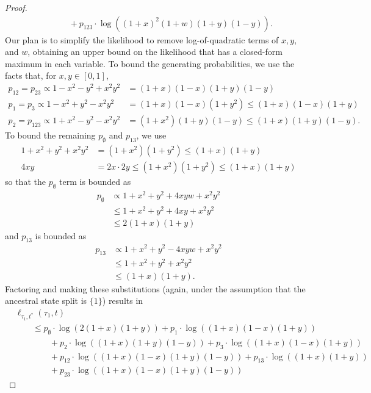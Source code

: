 \begin{proof}
\begin{align}
    &\qquad + p_{123}        \cdot\log((1+x)^2   (1+w)(1+y)(1-y)).
\end{align}
Our plan is to simplify the likelihood to remove log-of-quadratic terms of $x,y,$ and $w$, obtaining an upper bound on the likelihood that has a closed-form maximum in each variable.
To bound the generating probabilities, we use the facts that, for $x,y\in[0,1]$,
\begin{align*}
p_{12} = p_{23} \propto 1-x^2-y^2+x^2y^2 & = (1+x)(1-x)(1+y)(1-y) \\
p_{1} = p_{3} \propto 1-x^2+y^2-x^2y^2 & = (1+x)(1-x)(1+y^2) \le (1+x)(1-x)(1+y) \\
p_{2} = p_{123} \propto 1+x^2-y^2-x^2y^2 & = (1+x^2)(1+y)(1-y) \le (1+x)(1+y)(1-y).
\end{align*}
To bound the remaining $p_{\emptyset}$ and $p_{13}$, we use
\begin{align*}
1+x^2+y^2+x^2y^2 & = (1+x^2)(1+y^2) \le (1+x)(1+y) \\
4xy & = 2x \cdot 2y \le (1+x^2)(1+y^2) \le (1+x)(1+y)
\end{align*}
so that the $p_{\emptyset}$ term is bounded as
\begin{align*}
    p_{\emptyset} & \propto 1+x^2+y^2+4xyw+x^2y^2 \\
                  & \le 1+x^2+y^2+4xy+x^2y^2 \\
                  & \le 2(1+x)(1+y)
\end{align*}
and $p_{13}$ is bounded as
\begin{align*}
    p_{13} & \propto 1+x^2+y^2-4xyw+x^2y^2 \\
                  & \le 1+x^2+y^2+x^2y^2 \\
                  & \le (1+x)(1+y).
\end{align*}
Factoring and making these substitutions (again, under the assumption that the ancestral state split is $\{1\}$) results in
\begin{align*}
&    \ell_{\tau_1,t^*}(\tau_1, t) \\
&\qquad \le      p_{\emptyset}  \cdot\log(2(1+x)(1+y))
+ p_{1}          \cdot\log((1+x)(1-x)(1+y)) \\
    &\qquad\qquad + p_{2}          \cdot\log((1+x)(1+y)(1-y))
+ p_{3}          \cdot\log((1+x)(1-x)(1+y)) \\
    &\qquad\qquad + p_{12}         \cdot\log((1+x)(1-x)(1+y)(1-y))
+ p_{13}         \cdot\log((1+x)(1+y)) \\
    &\qquad\qquad + p_{23}         \cdot\log((1+x)(1-x)(1+y)(1-y))

\end{align*}
\end{proof}
